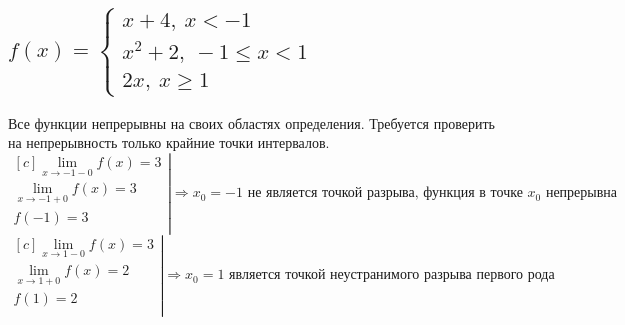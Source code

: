 \documentclass[12pt]{article}
\begin{document}
\begin{sloppypar}
    \subsection{$f(x) = \left\{\begin{array}{l}
                x + 4,\ x < -1          \\
                x^2 + 2,\ -1 \leq x < 1 \\
                2x,\ x \geq 1
            \end{array}\right.
        $}
    Все функции непрерывны на своих областях определения. Требуется проверить на непрерывность только крайние точки интервалов.
    \[
        \left.\begin{aligned}[c]
            \lim_{x \rightarrow -1 - 0} f(x) = 3 \\
            \lim_{x \rightarrow -1 + 0} f(x) = 3 \\
            f(-1) = 3                            \\
        \end{aligned}\right|
        \Rightarrow
        x_0 = -1 \text{ не является точкой разрыва, функция в точке $x_0$ непрерывна}
    \]
    \[
        \left.\begin{aligned}[c]
            \lim_{x \rightarrow 1 - 0} f(x) = 3 \\
            \lim_{x \rightarrow 1 + 0} f(x) = 2 \\
            f(1) = 2                            \\
        \end{aligned}\right|
        \Rightarrow
        x_0 = 1 \text{ является точкой неустранимого разрыва первого рода}
    \]


\end{sloppypar}
\end{document}

